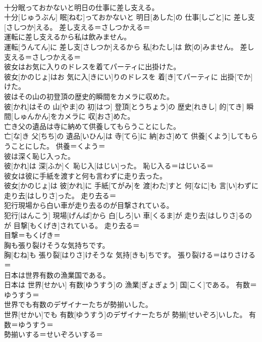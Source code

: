 \documentclass[8pt]{extreport}
\begin{document}
\begin{CJK}{UTF8}{min}
\\	十分眠っておかないと明日の仕事に差し支える。	
\\	十分[じゅうぶん] 眠[ねむ]っておかないと 明日[あした]の 仕事[しごと]に 差し支[さしつか]える。	差し支える＝さしつかえる＝ 
\\	運転に差し支えるから私は飲みません。	
\\	運転[うんてん]に 差し支[さしつか]えるから 私[わたし]は 飲[の]みません。	差し支える＝さしつかえる＝ 
\\	彼女はお気に入りのドレスを着てパーティに出掛けた。	
\\	彼女[かのじょ]はお 気に入[きにい]りのドレスを 着[き]てパーティに 出掛[でか]けた。	
\\	彼はその山の初登頂の歴史的瞬間をカメラに収めた。	
\\	彼[かれ]はその 山[やま]の 初[はつ] 登頂[とうちょう]の 歴史[れきし] 的[てき] 瞬間[しゅんかん]をカメラに 収[おさ]めた。	
\\	亡き父の遺品は寺に納めて供養してもらうことにした。	
\\	亡[な]き 父[ちち]の 遺品[いひん]は 寺[てら]に 納[おさ]めて 供養[くよう]してもらうことにした。	供養＝くよう＝ 
\\	彼は深く恥じ入った。	
\\	彼[かれ]は 深[ふか]く 恥じ入[はじい]った。	恥じ入る＝はじいる＝ 
\\	彼女は彼に手紙を渡すと何も言わずに走り去った。	
\\	彼女[かのじょ]は 彼[かれ]に 手紙[てがみ]を 渡[わた]すと 何[なに]も 言[い]わずに 走り去[はしりさ]った。	走り去る＝ 
\\	犯行現場から白い車が走り去るのが目撃されている。	
\\	犯行[はんこう] 現場[げんば]から 白[しろ]い 車[くるま]が 走り去[はしりさ]るのが 目撃[もくげき]されている。	走り去る＝ 
\\	目撃＝もくげき＝ 
\\	胸も張り裂けそうな気持ちです。	
\\	胸[むね]も 張り裂[はりさ]けそうな 気持[きも]ちです。	張り裂ける＝はりさける＝ 
\\	日本は世界有数の漁業国である。	
\\	日本は 世界[せかい] 有数[ゆうすう]の 漁業[ぎょぎょう] 国[こく]である。	有数＝ゆうすう＝ 
\\	世界でも有数のデザイナーたちが勢揃いした。	
\\	世界[せかい]でも 有数[ゆうすう]のデザイナーたちが 勢揃[せいぞろ]いした。	有数＝ゆうすう＝ 
\\	勢揃いする＝せいぞろいする＝ 

\end{CJK}
\end{document}
